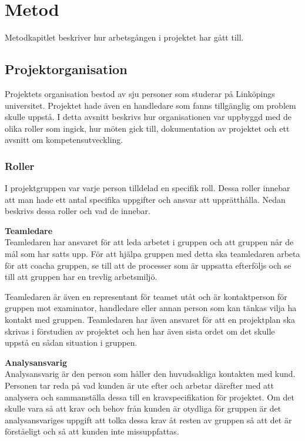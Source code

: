 \chapter{Metod}
Metodkapitlet beskriver hur arbetsgången i projektet har gått till.

\section{Projektorganisation}
Projektets organisation bestod av sju personer som studerar på Linköpings universitet. Projektet hade även en handledare som fanns tillgänglig om problem skulle uppstå. I detta avsnitt beskrivs hur organisationen var uppbyggd med de olika roller som ingick, hur möten gick till, dokumentation av projektet och ett avsnitt om kompetensutveckling.

\subsection{Roller}
I projektgruppen var varje person tilldelad en specifik roll. Dessa roller innebar att man hade ett antal specifika uppgifter och ansvar att upprätthålla. Nedan beskrivs dessa roller och vad de innebar.

\textbf{Teamledare}\\
Teamledaren har ansvaret för att leda arbetet i gruppen och att gruppen når de mål som har satts upp. För att hjälpa gruppen med detta ska teamledaren arbeta för att coacha gruppen, se till att de processer som är uppsatta efterföljs och se till att gruppen har en trevlig arbetsmiljö.

Teamledaren är även en representant för teamet utåt och är kontaktperson för gruppen mot examinator, handledare eller annan person som kan tänkas vilja ha kontakt med gruppen. Teamledaren har även ansvaret för att en projektplan ska skrivas i förstudien av projektet och hen har även sista ordet om det skulle uppstå en sådan situation i gruppen.

\textbf{Analysansvarig}\\
Analysansvarig är den person som håller den huvudsakliga kontakten med kund. Personen tar reda på vad kunden är ute efter och arbetar därefter med att analysera och sammanställa dessa till en kravspecifikation för projektet. Om det skulle vara så att krav och behov från kunden är otydliga för gruppen är det analysansvariges uppgift att tolka dessa krav åt resten av gruppen så att det är förståeligt och så att kunden inte missuppfattas.

